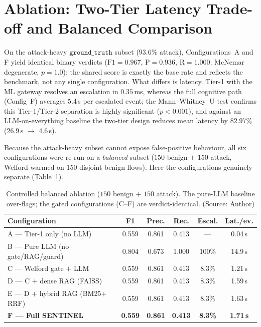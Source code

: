 \section{Ablation: Two-Tier Latency Trade-off and Balanced Comparison}
\label{sec:balanced}
On the attack-heavy $\texttt{ground\_truth}$ subset ($93.6\%$ attack), Configurations~A and F yield identical binary verdicts ($\mathrm{F1}=0.967$, $\mathrm{P}=0.936$, $\mathrm{R}=1.000$; McNemar degenerate, $p=1.0$): the shared score is exactly the base rate and reflects the benchmark, not any single configuration. What differs is latency. Tier-1 with the ML gateway resolves an escalation in $0.35$\,ms, whereas the full cognitive path (Config~F) averages $5.4$\,s per escalated event; the Mann--Whitney~U test confirms this Tier-1/Tier-2 separation is highly significant ($p<0.001$), and against an LLM-on-everything baseline the two-tier design reduces mean latency by $82.97\%$ ($26.9$\,s $\rightarrow$ $4.6$\,s).

Because the attack-heavy subset cannot expose false-positive behaviour, all six configurations were re-run on a \emph{balanced} subset ($150$ benign $+$ $150$ attack, Welford warmed on $150$ disjoint benign flows). Here the configurations genuinely separate (Table~\ref{tab:ablation_balanced}).

\begin{table}[!htbp]
    \centering \footnotesize \setlength{\tabcolsep}{4pt}
    \caption{Controlled balanced ablation ($150$ benign $+$ $150$ attack). The pure-LLM baseline over-flags; the gated configurations (C--F) are verdict-identical. (Source: Author)}
    \label{tab:ablation_balanced}
    \begin{tabular}{|>{\raggedright\arraybackslash}p{}|c|c|c|c|c|}
        \hline
        \textbf{Configuration} & \textbf{F1} & \textbf{Prec.} & \textbf{Rec.} & \textbf{Escal.} & \textbf{Lat./ev.} \\ \hline
        A --- Tier-1 only (no LLM) & 0.559 & 0.861 & 0.413 & --- & 0.04\,s \\ \hline
        B --- Pure LLM (no gate/RAG/guard) & 0.804 & 0.673 & 1.000 & 100\% & 14.9\,s \\ \hline
        C --- Welford gate $+$ LLM & 0.559 & 0.861 & 0.413 & 8.3\% & 1.21\,s \\ \hline
        D --- C $+$ dense RAG (FAISS) & 0.559 & 0.861 & 0.413 & 8.3\% & 1.59\,s \\ \hline
        E --- D $+$ hybrid RAG (BM25$+$RRF) & 0.559 & 0.861 & 0.413 & 8.3\% & 1.63\,s \\ \hline
        \textbf{F --- Full SENTINEL} & \textbf{0.559} & \textbf{0.861} & \textbf{0.413} & \textbf{8.3\%} & \textbf{1.71\,s} \\ \hline
    \end{tabular}
\end{table}

